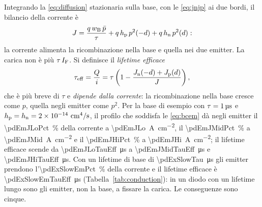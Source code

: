 \documentclass[10pt,a4paper]{scrartcl}
\let\newcommand\pdvaluedefine
\newcommand{\IF}{I_\mathrm{F}}
\newcommand{\wB}{w_\mathrm{B}}
\newcommand{\Jn}{J_\mathrm{n}}
\newcommand{\Jp}{J_\mathrm{p}}
\begin{document}
Integrando la \eqref{eq:diffusion} stazionaria sulla base, con le \eqref{eq:jnjp} ai due bordi, il bilancio della corrente è
\begin{equation}
J = \frac{q\,\wB\,\bar p}{\tau} + q\,h_\mathrm{p}\,p^2(-d) + q\,h_\mathrm{n}\,p^2(d) :
\label{eq:emitterbal}
\end{equation}
la corrente alimenta la ricombinazione nella base e quella nei due emitter. La carica non è più $\tau\,\IF$. Si definisce il \emph{lifetime efficace}
\begin{equation}
\tau_\mathrm{eff} = \frac{Q}{i} = \tau\left(1 - \frac{\Jn(-d) + \Jp(d)}{J}\right) ,
\label{eq:taueff}
\end{equation}
che è più breve di $\tau$ e \emph{dipende dalla corrente}: la ricombinazione nella base cresce come $p$, quella negli emitter come $p^2$. Per la base di esempio con $\tau = \SI{1}{\micro\second}$ e $h_\mathrm{p} = h_\mathrm{n} = \pdHem\ \si{\centi\metre^4\per\second}$, il profilo che soddisfa le \eqref{eq:bcem} dà negli emitter il \SI{\pdEmJLoPct}{\percent} della corrente a \SI{\pdEmJLo}{\ampere\per\centi\metre\squared}, il \SI{\pdEmJMidPct}{\percent} a \SI{\pdEmJMid}{\ampere\per\centi\metre\squared} e il \SI{\pdEmJHiPct}{\percent} a \SI{\pdEmJHi}{\ampere\per\centi\metre\squared}; il lifetime efficace scende da \SI{\pdEmJLoTauEff}{\micro\second} a \SI{\pdEmJMidTauEff}{\micro\second} e \SI{\pdEmJHiTauEff}{\micro\second}. Con un lifetime di base di \SI{\pdExSlowTau}{\micro\second} gli emitter prendono l'\SI{\pdExSlowEmPct}{\percent} della corrente e il lifetime efficace è \SI{\pdExSlowEmTauEff}{\micro\second} (Tabella~\ref{tab:conduction}): in un diodo con un lifetime lungo sono gli emitter, non la base, a fissare la carica. Le conseguenze sono cinque.
\end{document}

